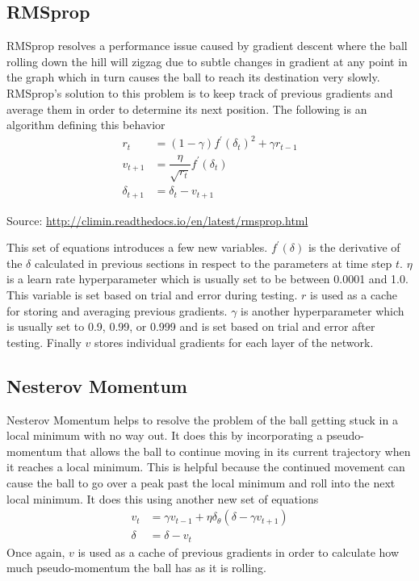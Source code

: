 \documentclass[12pt]{article}
\theoremstyle{definition}
\theoremstyle{plain}
\begin{document}
\subsection*{RMSprop}
RMSprop resolves a performance issue caused by gradient descent where the ball rolling down the hill will zigzag due to subtle changes in gradient at any point in the graph which in turn causes the ball to reach its destination very slowly. RMSprop's solution to this problem is to keep track of previous gradients and average them in order to determine its next position. The following is an algorithm defining this behavior
\begin{align*}
r_t &= (1-\gamma)f^\prime(\delta_t)^2+\gamma r_{t-1}\\
v_{t+1} &= \dfrac{\eta}{\sqrt{r_t}}f^\prime (\delta_t)\\
\delta_{t+1}&= \delta_t-v_{t+1}
\end{align*}
\begin{center}\small Source: \url{http://climin.readthedocs.io/en/latest/rmsprop.html}\end{center}
This set of equations introduces a few new variables. $f^\prime(\delta)$ is the derivative of the $\delta$ calculated in previous sections in respect to the parameters at time step $t$. $\eta$ is a learn rate hyperparameter which is usually set to be between 0.0001 and 1.0. This variable is set based on trial and error during testing. $r$ is used as a cache for storing and averaging previous gradients. $\gamma$ is another hyperparameter which is usually set to 0.9, 0.99, or 0.999 and is set based on trial and error after testing. Finally $v$ stores individual gradients for each layer of the network.\\

\subsection*{Nesterov Momentum}
Nesterov Momentum helps to resolve the problem of the ball getting stuck in a local minimum with no way out. It does this by incorporating a pseudo-momentum that allows the ball to continue moving in its current trajectory when it reaches a local minimum. This is helpful because the continued movement can cause the ball to go over a peak past the local minimum and roll into the next local minimum. It does this using another new set of equations
\begin{align*}
v_t &= \gamma v_{t-1}+\eta\delta_\theta (\delta - \gamma v_{t+1})\\
\delta &= \delta - v_t
\end{align*}
Once again, $v$ is used as a cache of previous gradients in order to calculate how much pseudo-momentum the ball has as it is rolling.
\end{document}
